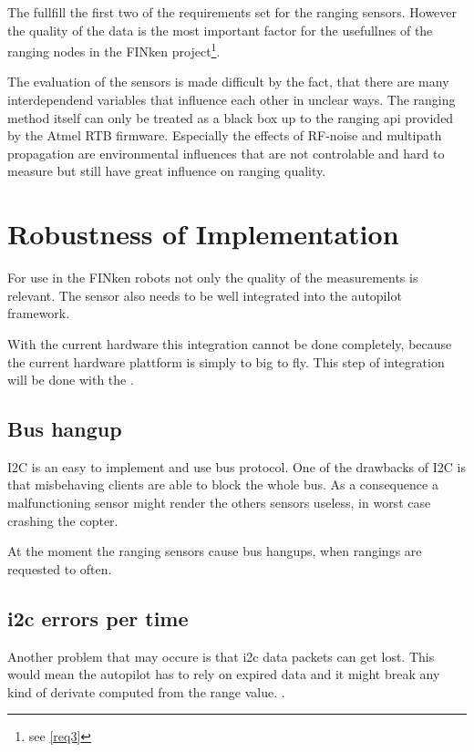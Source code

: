 The  fullfill the first two of the requirements set for the ranging sensors.
However the quality of the data is the most important factor for the usefullnes of the ranging nodes in the FINken project\footnote{see \autoref{req3}}.

The evaluation of the sensors is made difficult by the fact, that there are many interdependend variables that influence each other in unclear ways.
The ranging method itself can only be treated as a black box up to the ranging api provided by the Atmel RTB firmware.
Especially the effects of RF-noise and multipath propagation are environmental influences that are not controlable and hard to measure but still have great influence on ranging quality.

\section{Robustness of Implementation}

For use in the FINken robots not only the quality of the measurements is relevant.
The sensor also needs to be well integrated into the autopilot framework.

With the current hardware this integration cannot be done completely, because the current hardware plattform is simply to big to fly.
This step of integration will be done with the .

\subsection{Bus hangup}
I2C is an easy to implement and use bus protocol.
One of the drawbacks of I2C is that misbehaving clients are able to block the whole bus.
As a consequence a malfunctioning sensor might render the others sensors useless, in worst case crashing the copter.

At the moment the ranging sensors cause bus hangups, when rangings are requested to often.

\subsection{i2c errors per time}
Another problem that may occure is that i2c data packets can get lost.
This would mean the autopilot has to rely on expired data and it might break any kind of derivate computed from the range value. .


